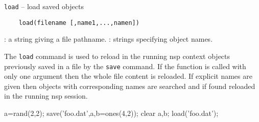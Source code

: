 \begin{mandesc}
  \texttt{load} --  load saved objects\\ %
\end{mandesc}
\label{load}
\begin{calling_sequence}
  \begin{verbatim}
    load(filename [,name1,...,namen])  
  \end{verbatim}
\end{calling_sequence}
\begin{parameters}
  \begin{varlist}
     : a string giving a file pathname.
     : strings specifying object names. 
  \end{varlist}
\end{parameters}
\begin{mandescription}
  The \verb!load! command is used to reload in the running nsp context 
  objects previously saved in a file by the \verb!save! command. 
  If the function is called with only one argument then the 
  whole file content is reloaded. If explicit names are given then 
  objects with corresponding names are searched and if found reloaded in 
  the running nsp session. 
\end{mandescription}
\begin{examples}
  \begin{program}
    a=rand(2,2);
    save('foo.dat',a,b=ones(4,2));
    clear a,b;
    load('foo.dat');
  \end{program}
\end{examples}
\begin{manseealso}
\end{manseealso}

